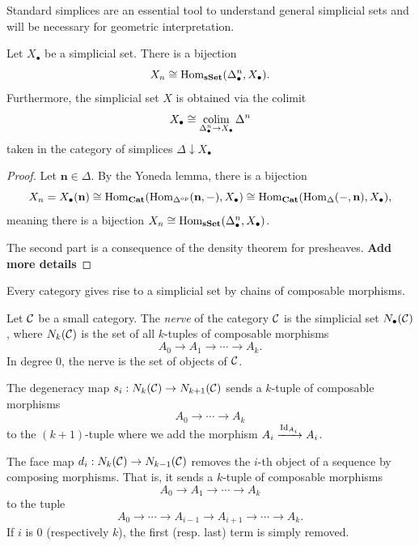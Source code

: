 Standard simplices are an essential tool to understand general simplicial sets and will be necessary for geometric interpretation.

\begin{proposition}\label{prop:sset_as_colimit}
    Let $X_{\bullet}$ be a simplicial set. There is a bijection
    \[ X_n \cong \Hom[\sSet]{\Delta^n_{\bullet}}{X_{\bullet}}. \]
    Furthermore, the simplicial set $X$ is obtained via the colimit
    \[ X_{\bullet} \cong \colim_{\Delta^n_{\bullet} \to X_{\bullet}} \Delta^n \]
    taken in the category of simplices $\Delta \downarrow X_{\bullet}$
\end{proposition}

\begin{proof}
    Let $\textbf{n} \in \Delta$. By the Yoneda lemma, there is a bijection
    \[ X_n = X_{\bullet}(\textbf{n}) \cong \Hom[\Cat]{\Hom[\op{\Delta}]{\textbf{n}}{-}}{X_{\bullet}} \cong \Hom[\Cat]{\Hom[\Delta]{-}{\textbf{n}}}{X_{\bullet}}, \]
    meaning there is a bijection $ X_n \cong \Hom[\sSet]{\Delta^n_{\bullet}}{X_{\bullet}}$.
    
    The second part is a consequence of the density theorem for presheaves. \textbf{Add more details}
\end{proof}

Every category gives rise to a simplicial set by chains of composable morphisms.

\begin{definition}
    Let $\CC$ be a small category. The \emph{nerve} of the category $\CC$ is the simplicial set $N_{\bullet}(\CC)$, where $N_k(\CC)$ is the set of all $k$-tuples of composable morphisms 
    \[ A_0 \to A_1 \to \cdots \to A_k. \]
    In degree $0$, the nerve is the set of objects of $\CC$.

    The degeneracy map $s_i : N_k(\CC) \to N_{k+1}(\CC)$ sends a $k$-tuple of composable morphisms
    \[ A_0 \to \cdots \to A_k \]
    to the $(k+1)$-tuple where we add the morphism $A_i \xto{\Id{A_i}} A_i$.

    The face map $d_i : N_k(\CC) \to N_{k-1}(\CC)$ removes the $i$-th object of a sequence by  composing morphisms. That is, it sends a $k$-tuple of composable morphisms
    \[ A_0 \to A_1 \to \cdots \to A_k \]
    to the tuple 
    \[ A_0 \to \cdots \to A_{i-1} \to A_{i+1} \to \cdots \to A_k. \]
    If $i$ is $0$ (respectively $k$), the first (resp. last) term is simply removed.
\end{definition}

